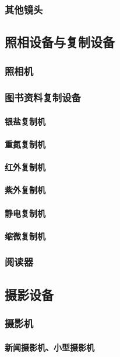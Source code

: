 \documentclass[UTF8]{../../ApplicationUniverse}
\begin{document}
        \subsubsection{其他镜头}
    \subsection{照相设备与复制设备}
        \subsubsection{照相机}
        \subsubsection{图书资料复制设备}
            \paragraph{银盐复制机}
            \paragraph{重氮复制机}
            \paragraph{红外复制机}
            \paragraph{紫外复制机}
            \paragraph{静电复制机}
            \paragraph{缩微复制机}
        \subsubsection{阅读器}
    \subsection{摄影设备}
        \subsubsection{摄影机}
            \paragraph{新闻摄影机、小型摄影机}
\end{document}
